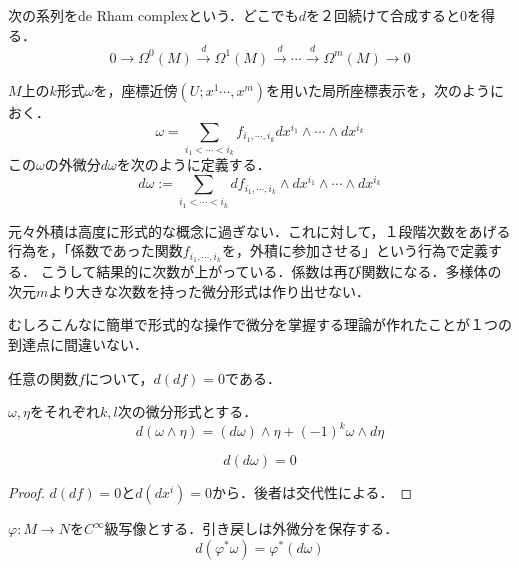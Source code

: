 \documentclass[uplatex, dvipdfmx]{jsreport}
\begin{document}
次の系列をde Rham complexという．どこでも$d$を２回続けて合成すると$0$を得る．
\[ 0\to\Omega^0(M)\xrightarrow{d}\Omega^1(M)\xrightarrow{d}\cdots\xrightarrow{d}\Omega^m(M)\to 0 \]

\begin{proposition}
    $M$上の$k$形式$\omega$を，座標近傍$(U;x^1\cdots,x^m)$を用いた局所座標表示を，次のようにおく．
    \[ \omega=\sum_{i_1<\cdots<i_k}f_{i_1,\cdots,i_k}dx^{i_1}\wedge\cdots\wedge dx^{i_k} \]
    この$\omega$の外微分$d\omega$を次のように定義する．
    \[ d\omega :=\sum_{i_1<\cdots<i_k}df_{i_1,\cdots,i_k}\wedge dx^{i_1}\wedge\cdots\wedge dx^{i_k} \]
\end{proposition}
\begin{remark}
    元々外積は高度に形式的な概念に過ぎない．これに対して，１段階次数をあげる行為を，「係数であった関数$f_{i_1,\cdots,i_k}$を，外積に参加させる」という行為で定義する．
    こうして結果的に次数が上がっている．係数は再び関数になる．多様体の次元$m$より大きな次数を持った微分形式は作り出せない．

    むしろこんなに簡単で形式的な操作で微分を掌握する理論が作れたことが１つの到達点に間違いない．
\end{remark}

\begin{proposition}
    任意の関数$f$について，$d(df)=0$である．
\end{proposition}

\begin{proposition}
    
\end{proposition}

\begin{proposition}
    $\omega,\eta$をそれぞれ$k,l$次の微分形式とする．
    \[ d(\omega\wedge\eta)=(d\omega)\wedge\eta+(-1)^k\omega\wedge d\eta \]
\end{proposition}

\begin{proposition}
    \[ d(d\omega)=0 \]
\end{proposition}
\begin{proof}
    $d(df)=0$と$d(dx^i)=0$から．後者は交代性による．
\end{proof}

\begin{proposition}[pullback]

    $\varphi:M\to N$を$C^\infty$級写像とする．引き戻しは外微分を保存する．
    \[ d(\varphi^*\omega)=\varphi^*(d\omega) \]
\end{proposition}
\end{document}

